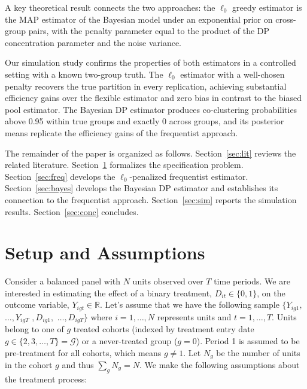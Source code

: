 \documentclass[margin=3in, 12pt]{article}
\newcommand{\1}{\mathbbm{1}}
\begin{document}
A key theoretical result connects the two approaches: the $\ell_0$ greedy estimator is the MAP estimator of the Bayesian model under an exponential prior on cross-group pairs, with the penalty parameter equal to the
product of the DP concentration parameter and the noise variance.

Our simulation study confirms the properties of both estimators in a controlled setting with a known two-group truth. The $\ell_0$ estimator with
a well-chosen penalty recovers the true partition in every replication, achieving substantial efficiency gains over the flexible estimator and zero bias
in contrast to the biased pool estimator. The Bayesian DP estimator produces co-clustering probabilities above 0.95 within true groups and
exactly 0 across groups, and its posterior means replicate the efficiency gains of the frequentist approach.

The remainder of the paper is organized as follows. Section~\ref{sec:lit} reviews the related literature. Section~\ref{sec:problem} formalizes the specification problem. 
Section~\ref{sec:freq} develops the $\ell_0$-penalized frequentist estimator. 
Section~\ref{sec:bayes} develops the Bayesian DP estimator and establishes its connection to the frequentist approach.
Section~\ref{sec:sim} reports the simulation results. Section~\ref{sec:conc} concludes.
\section{Setup and Assumptions}
\label{sec:problem}
Consider a balanced panel with $N$ units observed over $T$ time periods. We are interested in estimating the effect of a binary treatment, $D_{it} \in \{0,1\}$, on the outcome variable, $Y_{igt} \in \mathbb{R}$. Let's assume that we have the following sample $\{Y_{ig1},$ $\dotsc,Y_{igT}$ $,D_{ig1},$ $\dotsc,D_{igT}\}$ where $i = 1,\dotsc, N$ represents units and $t = 1,\dotsc, T$. Units belong to one of $g$ treated cohorts (indexed by treatment entry date $g \in \{2,3,\dotsc,T\} = \mathcal{G}$) or a never-treated group ($g=0$). Period 1 is assumed to be pre-treatment for all cohorts, which means $g\neq 1$. Let $N_g$ be the number of units in the cohort $g$ and thus $\sum_{g}N_g = N$. We make the following assumptions about the treatment process:
\end{document}
